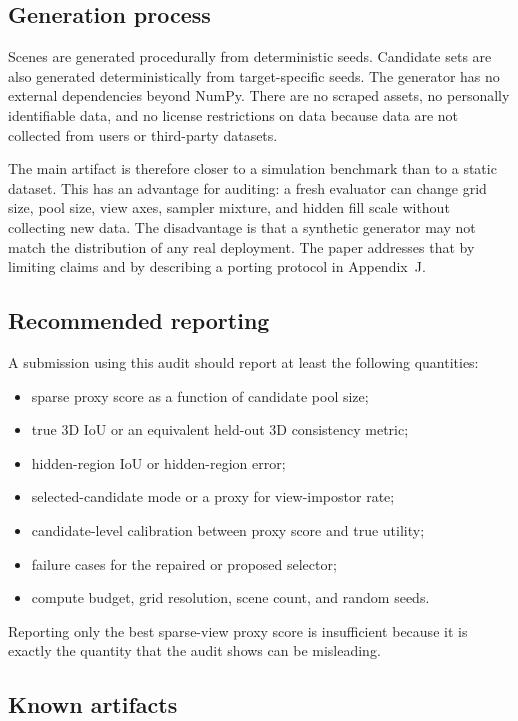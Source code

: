 \documentclass{article}
\begin{document}
\subsection{Generation process}

Scenes are generated procedurally from deterministic seeds. Candidate sets are
also generated deterministically from target-specific seeds. The generator has
no external dependencies beyond NumPy. There are no scraped assets, no
personally identifiable data, and no license restrictions on data because data
are not collected from users or third-party datasets.

The main artifact is therefore closer to a simulation benchmark than to a
static dataset. This has an advantage for auditing: a fresh evaluator can
change grid size, pool size, view axes, sampler mixture, and hidden fill scale
without collecting new data. The disadvantage is that a synthetic generator may
not match the distribution of any real deployment. The paper addresses that by
limiting claims and by describing a porting protocol in Appendix~J.

\subsection{Recommended reporting}

A submission using this audit should report at least the following quantities:
\begin{itemize}
  \item sparse proxy score as a function of candidate pool size;
  \item true 3D IoU or an equivalent held-out 3D consistency metric;
  \item hidden-region IoU or hidden-region error;
  \item selected-candidate mode or a proxy for view-impostor rate;
  \item candidate-level calibration between proxy score and true utility;
  \item failure cases for the repaired or proposed selector;
  \item compute budget, grid resolution, scene count, and random seeds.
\end{itemize}
Reporting only the best sparse-view proxy score is insufficient because it is
exactly the quantity that the audit shows can be misleading.

\subsection{Known artifacts}
\end{document}
